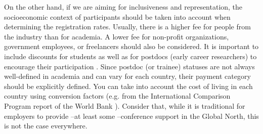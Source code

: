 \documentclass[10pt,letterpaper]{article}
\begin{document}
On the other hand, if we are aiming for inclusiveness and representation, the socioeconomic context of participants should be taken into account when determining the registration rates. Usually, there is a higher fee for people from the industry than for academia. A lower fee for non-profit organizations, government employees, or freelancers should also be considered. It is important to include discounts for students as well as for postdocs (early career researchers) to encourage their participation \cite{sarabipour_evaluating_2020, andalib_postdoc_2018, kaplan_postdoc_2012}. Since postdoc (or trainee) statuses are not always well-defined in academia and can vary for each country, their payment category should be explicitly defined. You can take into account the cost of living in each country using conversion factors (e.g. from the International Comparison Program report of the World Bank \cite{arend_disparity_2019}). Consider that, while it is traditional for employers to provide --at least some --conference support in the Global North, this is not the case everywhere. 

\end{document}
